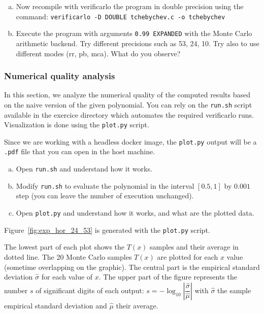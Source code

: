 \begin{question}
  \begin{enumerate}[(a)]
  \item Now recompile with verificarlo the program in double precision using the command:\newline
    {\tt verificarlo -D DOUBLE tchebychev.c -o tchebychev} \\
  \item Execute the program with arguments \texttt{0.99 EXPANDED} with the Monte Carlo arithmetic backend. Try different precisions such as 53, 24, 10. Try also to use different modes (rr, pb, mca). What do you observe?
  \end{enumerate}
\end{question}

\subsubsection{Numerical quality analysis}

In this section, we analyze the numerical quality of the computed results based on the naive version of the given polynomial. 
You can rely on the \texttt{run.sh} script available in the exercice directory which automates the required verificarlo runs. 
Visualization is done using the \texttt{plot.py} script.

Since we are working with a headless docker image, the \texttt{plot.py} output
will be a \texttt{.pdf} file that you can open in the host machine.


\begin{question}
  \begin{enumerate}[(a)]
 \item Open {\tt run.sh} and understand how it works.
  \item Modify {\tt run.sh} to evaluate the polynomial in the interval $[0.5,1]$ by $0.001$ step (you can leave the number of execution unchanged).
  \item Open {\tt plot.py} and understand how it works, and what are the plotted data.
  \end{enumerate}
\end{question}

Figure~\ref{fig:exp_hor_24_53} is generated with the \texttt{plot.py} script.

The lowest part of each plot shows the $T(x)$ samples and their average in dotted line. The 20 Monte Carlo samples $T(x)$ are plotted for each $x$ value (sometime overlapping on the graphic).
The central part is the empirical standard deviation $\hat\sigma$ for each value of $x$.
The upper part of the figure represents the number $s$ of significant digits of each output: $s=-\log_{10}\left|\dfrac{\hat\sigma}{\hat\mu}\right|$ with $\hat\sigma$ the sample empirical standard deviation and $\hat\mu$ their average.

